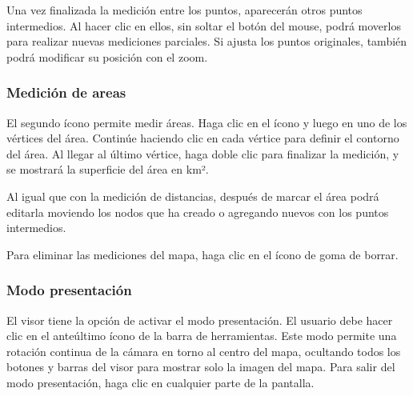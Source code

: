 \documentclass[a4paper,11pt,spanish]{sphinxmanual}
\begin{document}
\noindent{}

\sphinxAtStartPar
Una vez finalizada la medición entre los puntos, aparecerán otros puntos intermedios. Al hacer clic en ellos, sin soltar el botón del mouse, podrá moverlos para realizar nuevas mediciones parciales. Si ajusta los puntos originales, también podrá modificar su posición con el zoom.

\noindent{}


\subsubsection{Medición de areas}
\label{\detokenize{tools/measuring:medicion-de-areas}}

\sphinxAtStartPar
El segundo ícono permite medir áreas. Haga clic en el ícono y luego en uno de los vértices del área. Continúe haciendo clic en cada vértice para definir el contorno del área. Al llegar al último vértice, haga doble clic para finalizar la medición, y se mostrará la superficie del área en km².

\sphinxAtStartPar
Al igual que con la medición de distancias, después de marcar el área podrá editarla moviendo los nodos que ha creado o agregando nuevos con los puntos intermedios.

\noindent{}

\sphinxAtStartPar
Para eliminar las mediciones del mapa, haga clic en el ícono de goma de borrar.



\subsubsection{Modo presentación}
\label{\detokenize{tools/measuring:modo-presentacion}}

\sphinxAtStartPar
El visor tiene la opción de activar el modo presentación. El usuario debe hacer clic en el anteúltimo ícono de la barra de herramientas. Este modo permite una rotación continua de la cámara en torno al centro del mapa, ocultando todos los botones y barras del visor para mostrar solo la imagen del mapa. Para salir del modo presentación, haga clic en cualquier parte de la pantalla.
\end{document}
